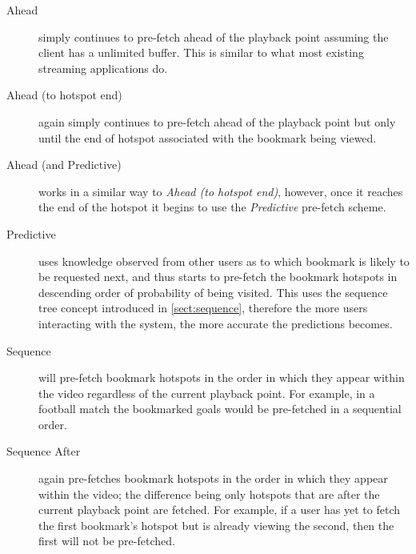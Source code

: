 

\begin{description}
  \item[Ahead] simply continues to pre-fetch ahead of the playback point assuming the client has a unlimited buffer. This is similar to what most existing streaming applications do.

  \item[Ahead (to hotspot end)] again simply continues to pre-fetch ahead of the playback point but only until the end of hotspot associated with the bookmark being viewed.

  \item[Ahead (and Predictive)] works in a similar way to \emph{Ahead (to hotspot end)}, however, once it reaches the end of the hotspot it begins to use the \emph{Predictive} pre-fetch scheme.

  \item[Predictive] uses knowledge observed from other users as to which bookmark is likely to be requested next, and thus starts to pre-fetch the bookmark hotspots in descending order of probability of being visited. This uses the sequence tree concept introduced in \autoref{sect:sequence}, therefore the more users interacting with the system, the more accurate the predictions becomes.

  \item[Sequence] will pre-fetch bookmark hotspots in the order in which they appear within the video regardless of the current playback point. For example, in a football match the bookmarked goals would be pre-fetched in a sequential order.

  \item[Sequence After] again pre-fetches bookmark hotspots in the order in which they appear within the video; the difference being only hotspots that are after the current playback point are fetched. For example, if a user has yet to fetch the first bookmark's hotspot but is already viewing the second, then the first will not be pre-fetched.


\end{description}


